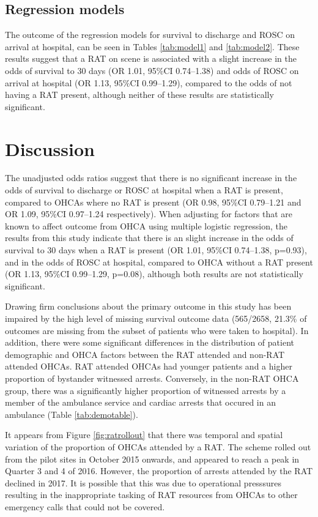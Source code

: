 \documentclass[]{article}
\theoremstyle{definition}
\theoremstyle{definition}
\theoremstyle{definition}
\theoremstyle{remark}
\begin{document}
\hypertarget{regression-models}{%
\subsection{Regression models}\label{regression-models}}

The outcome of the regression models for survival to discharge and ROSC
on arrival at hospital, can be seen in Tables \ref{tab:model1} and
\ref{tab:model2}. These results suggest that a RAT on scene is
associated with a slight increase in the odds of survival to 30 days (OR
1.01, 95\%CI 0.74--1.38) and odds of ROSC on arrival at hospital (OR
1.13, 95\%CI 0.99--1.29), compared to the odds of not having a RAT
present, although neither of these results are statistically
significant.

\hypertarget{discussion}{%
\section{Discussion}\label{discussion}}

The unadjusted odds ratios suggest that there is no significant increase
in the odds of survival to discharge or ROSC at hospital when a RAT is
present, compared to OHCAs where no RAT is present (OR 0.98, 95\%CI
0.79--1.21 and OR 1.09, 95\%CI 0.97--1.24 respectively). When adjusting
for factors that are known to affect outcome from OHCA using multiple
logistic regression, the results from this study indicate that there is
an slight increase in the odds of survival to 30 days when a RAT is
present (OR 1.01, 95\%CI 0.74--1.38, p=0.93), and in the odds of ROSC at
hospital, compared to OHCA without a RAT present (OR 1.13, 95\%CI
0.99--1.29, p=0.08), although both results are not statistically
significant.

Drawing firm conclusions about the primary outcome in this study has
been impaired by the high level of missing survival outcome data
(565/2658, 21.3\% of outcomes are missing from the subset of patients
who were taken to hospital). In addition, there were some significant
differences in the distribution of patient demographic and OHCA factors
between the RAT attended and non-RAT attended OHCAs. RAT attended OHCAs
had younger patients and a higher proportion of bystander witnessed
arrests. Conversely, in the non-RAT OHCA group, there was a
significantly higher proportion of witnessed arrests by a member of the
ambulance service and cardiac arrests that occured in an ambulance
(Table \ref{tab:demotable}).

It appears from Figure \ref{fig:ratrollout} that there was temporal and
spatial variation of the proportion of OHCAs attended by a RAT. The
scheme rolled out from the pilot sites in October 2015 onwards, and
appeared to reach a peak in Quarter 3 and 4 of 2016. However, the
proportion of arrests attended by the RAT declined in 2017. It is
possible that this was due to operational presssures resulting in the
inappropriate tasking of RAT resources from OHCAs to other emergency
calls that could not be covered.
\end{document}
